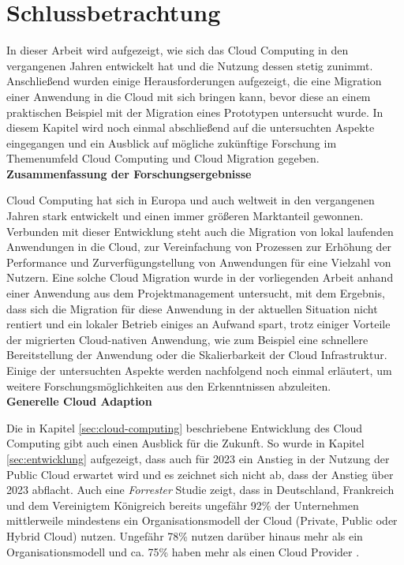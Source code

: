 \chapter{Schlussbetrachtung}
\label{chap:schlussbetrachtung}
In dieser Arbeit wird aufgezeigt, wie sich das Cloud Computing in den vergangenen Jahren entwickelt hat und die Nutzung dessen stetig zunimmt. Anschließend wurden einige Herausforderungen aufgezeigt, die eine Migration einer Anwendung in die Cloud mit sich bringen kann, bevor diese an einem praktischen Beispiel mit der Migration eines Prototypen untersucht wurde. In diesem Kapitel wird noch einmal abschließend auf die untersuchten Aspekte eingegangen und ein Ausblick auf mögliche zukünftige Forschung im Themenumfeld Cloud Computing und Cloud Migration gegeben. \\

\textbf{Zusammenfassung der Forschungsergebnisse}

Cloud Computing hat sich in Europa und auch weltweit in den vergangenen Jahren stark entwickelt und einen immer größeren Marktanteil gewonnen. Verbunden mit dieser Entwicklung steht auch die Migration von lokal laufenden Anwendungen in die Cloud, zur Vereinfachung von Prozessen zur Erhöhung der Performance und Zurverfügungstellung von Anwendungen für eine Vielzahl von Nutzern. Eine solche Cloud Migration wurde in der vorliegenden Arbeit anhand einer Anwendung aus dem Projektmanagement untersucht, mit dem Ergebnis, dass sich die Migration für diese Anwendung in der aktuellen Situation nicht rentiert und ein lokaler Betrieb einiges an Aufwand spart, trotz einiger Vorteile der migrierten Cloud-nativen Anwendung, wie zum Beispiel eine schnellere Bereitstellung der Anwendung oder die Skalierbarkeit der Cloud Infrastruktur. Einige der untersuchten Aspekte werden nachfolgend noch einmal erläutert, um weitere Forschungsmöglichkeiten aus den Erkenntnissen abzuleiten. \\

\textbf{Generelle Cloud Adaption}

Die in Kapitel \ref{sec:cloud-computing} beschriebene Entwicklung des Cloud Computing gibt auch einen Ausblick für die Zukunft. So wurde in Kapitel \ref{sec:entwicklung} aufgezeigt, dass auch für 2023 ein Anstieg in der Nutzung der Public Cloud erwartet wird und es zeichnet sich nicht ab, dass der Anstieg über 2023 abflacht. Auch eine \textit{Forrester} Studie zeigt, dass in Deutschland, Frankreich und dem Vereinigtem Königreich bereits ungefähr 92\% der Unternehmen mittlerweile mindestens ein Organisationsmodell der Cloud (Private, Public oder Hybrid Cloud) nutzen. Ungefähr 78\% nutzen darüber hinaus mehr als ein Organisationsmodell und ca. 75\% haben mehr als einen Cloud Provider \cite[Vgl.][S. 4]{Rajamani2022}. \pagebreak

